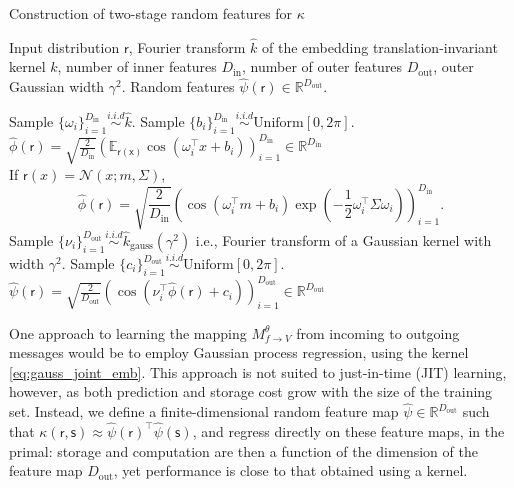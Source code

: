\documentclass[english]{article}
\theoremstyle{plain}
\theoremstyle{plain}
\newcommand{\factor}{f}				%
\newcommand{\outV}{V}                         %
\newcommand{\approxMsg}[3]{M_{#1 \rightarrow #2}^{#3}}			%
\begin{document}
\begin{algorithm}[t]
\caption{Construction of two-stage random features for $\kappa$}
\label{algo:random_features_kgg}
\begin{algorithmic}[1]
\REQUIRE Input distribution $\mathsf{r}$, Fourier transform $\hat{k}$ of 
the embedding translation-invariant kernel $k$, number of inner features $D_\mathrm{in}$, number of outer features $D_\mathrm{out}$, outer Gaussian width $\gamma^2$.
\ENSURE Random features $\hat{\psi}(\mathsf{r}) \in \mathbb{R}^{D_\mathrm{out}}$. 

\STATE Sample  $\{ \omega_i \}_{i=1}^{D_\mathrm{in}} \overset{i.i.d}{\sim} \hat{k}$.
\STATE Sample $\{b_i\}_{i=1}^{D_\mathrm{in}} \overset{i.i.d}{\sim} \text{Uniform}[0, 2\pi] $.
\STATE $\hat{\phi}(\mathsf{r}) = \sqrt{\frac{2}{D_\mathrm{in}}} \left( \mathbb{E}_{\mathsf{r(x)}} 
\cos(\omega_{i}^{\top}x+b_{i} ) \right)_{i=1}^{D_\mathrm{in}} \in \mathbb{R}^{D_\mathrm{in}}$ \\
If $\mathsf{r}(x)=\mathcal{N}(x;m, \Sigma )$, 
\small
\begin{equation*}
\hat{\phi}( \mathsf{r}) = \sqrt{\frac{2}{D_\mathrm{in}}} \left( \cos(\omega_{i}^{\top}m +b_{i}) \exp 
\left(-\frac{1}{2}\omega_{i}^{\top}\Sigma \omega_{i} \right) \right)_{i=1}^{D_\mathrm{in}}.
\end{equation*}
%
\STATE Sample $\{ \nu_i \}_{i=1}^{D_\mathrm{out}} \overset{i.i.d}{\sim} \hat{k}_{\text{gauss}}(\gamma^{2})$
i.e., Fourier transform of a Gaussian kernel with width $\gamma^2$.
\STATE Sample $\{c_i\}_{i=1}^{D_\mathrm{out}} \overset{i.i.d}{\sim} \text{Uniform}[0, 2\pi] $.
\STATE $\hat{\psi}(\mathsf{r}) = \sqrt{\frac{2}{D_\mathrm{out}}} \left(  
\cos(\nu_{i}^{\top} \hat{\phi}(\mathsf{r}) + c_{i} ) \right)_{i=1}^{D_\mathrm{out}} \in 
\mathbb{R}^{D_\mathrm{out}}$
\end{algorithmic}
\end{algorithm}

One approach to learning the mapping  $\approxMsg{\factor}{\outV}{\theta}$ from incoming to outgoing messages
would be to employ Gaussian process regression, using the kernel \eqref{eq:gauss_joint_emb}.
This approach is not suited to just-in-time (JIT) learning, however,
as both prediction and storage cost grow with the size of the training set.
Instead, we define 
a finite-dimensional random feature map $\hat{\psi} \in \mathbb{R}^{D_\mathrm{out}}$ such that 
$\kappa(\mathsf{r}, \mathsf{s}) \approx \hat{\psi}(\mathsf{r})^\top \hat{\psi}(\mathsf{s})$, 
and regress directly on these feature maps, in the primal: storage and computation 
are then a function of the dimension of the feature map $D_\mathrm{out}$, yet performance is close to that
obtained using a kernel.
\end{document}
